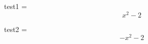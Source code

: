 \documentclass{article}
\begin{document}
test1 = 
	$$ x^{2} - 2 $$

test2 = 
	$$ - x^{2} - 2 $$
\end{document}
